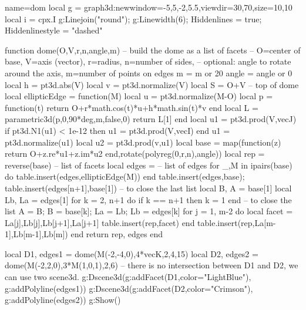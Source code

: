 \documentclass[12pt]{standalone}%
\begin{document}
\begin{luadraw}{name=dom}
local g = graph3d:new{window={-5,5,-2,5.5},viewdir={30,70},size={10,10}}
local i = cpx.I
g:Linejoin("round"); g:Linewidth(6); Hiddenlines = true; Hiddenlinestyle = "dashed"

function dome(O,V,r,n,angle,m) -- build the dome as a list of facets
-- O=center of base, V=axis (vector), r=radius, n=number of sides,
-- optional: angle to rotate around the axis, m=number of points on edges
    m = m or 20
    angle = angle or 0
    local h = pt3d.abs(V)
    local v = pt3d.normalize(V)
    local S = O+V -- top of dome
    local ellipticEdge = function(M)
        local u = pt3d.normalize(M-O)
        local p = function(t)
            return O+r*math.cos(t)*u+h*math.sin(t)*v
        end
        local L = parametric3d(p,0,90*deg,m,false,0)
        return L[1]
    end
    local u1 = pt3d.prod(V,vecJ)
    if pt3d.N1(u1) < 1e-12 then u1 = pt3d.prod(V,vecI) end
    u1 = pt3d.normalize(u1)
    local u2 = pt3d.prod(v,u1)
    local base = map(function(z) return O+z.re*u1+z.im*u2 end,rotate(polyreg(0,r,n),angle))
    local rep = {reverse(base)}  -- list of facets
    local edges = {}  -- list of edges
    for _,M in ipairs(base) do
        table.insert(edges,ellipticEdge(M))
    end
    table.insert(edges,base); table.insert(edges[n+1],base[1]) -- to close the last list
    local B, A = base[1]
    local Lb, La = edges[1]
    for k = 2, n+1 do
        if k == n+1 then k = 1 end -- to close the list
        A = B; B = base[k]; La = Lb; Lb = edges[k]
        for j = 1, m-2 do
            local facet = {La[j],Lb[j],Lb[j+1],La[j+1]}
            table.insert(rep,facet)
        end
        table.insert(rep,{La[m-1],Lb[m-1],Lb[m]})
    end
    return rep, edges
end

local D1, edges1 = dome(M(-2,-4,0),4*vecK,2,4,15)
local D2, edges2 = dome(M(-2,2,0),3*M(1,0,1),2,6)
-- there is no intersection between D1 and D2, we can use two scene3d.
g:Dscene3d(g:addFacet(D1,{color="LightBlue"}), g:addPolyline(edges1))
g:Dscene3d(g:addFacet(D2,{color="Crimson"}), g:addPolyline(edges2))
g:Show()
\end{luadraw}
\end{document}
